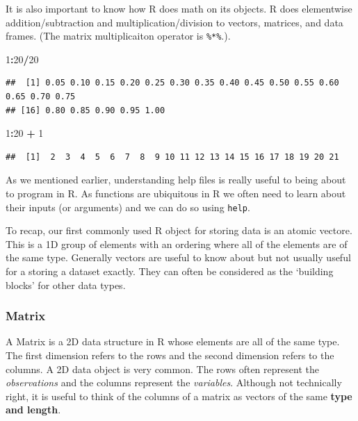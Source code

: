 \documentclass[
]{book}
\newenvironment{Shaded}{\begin{snugshade}}{\end{snugshade}}
\newcommand{\DecValTok}[1]{\textcolor[rgb]{0.00,0.00,0.81}{#1}}
\newcommand{\OperatorTok}[1]{\textcolor[rgb]{0.81,0.36,0.00}{\textbf{#1}}}
\newcommand{\StringTok}[1]{\textcolor[rgb]{0.31,0.60,0.02}{#1}}
\theoremstyle{definition}
\theoremstyle{definition}
\theoremstyle{definition}
\theoremstyle{remark}
\begin{document}
It is also important to know how R does math on its objects. R does elementwise addition/subtraction and multiplication/division to vectors, matrices, and data frames. (The matrix multiplicaiton operator is \texttt{\%*\%}.).

\begin{Shaded}
\begin{Highlighting}[]
\DecValTok{1}\OperatorTok{:}\DecValTok{20}\OperatorTok{/}\DecValTok{20}
\end{Highlighting}
\end{Shaded}

\begin{verbatim}
##  [1] 0.05 0.10 0.15 0.20 0.25 0.30 0.35 0.40 0.45 0.50 0.55 0.60 0.65 0.70 0.75
## [16] 0.80 0.85 0.90 0.95 1.00
\end{verbatim}

\begin{Shaded}
\begin{Highlighting}[]
\DecValTok{1}\OperatorTok{:}\DecValTok{20} \OperatorTok{+}\StringTok{ }\DecValTok{1}
\end{Highlighting}
\end{Shaded}

\begin{verbatim}
##  [1]  2  3  4  5  6  7  8  9 10 11 12 13 14 15 16 17 18 19 20 21
\end{verbatim}

As we mentioned earlier, understanding help files is really useful to being about to program in R. As functions are ubiquitous in R we often need to learn about their inputs (or arguments) and we can do so using \texttt{help}.

To recap, our first commonly used R object for storing data is an atomic vectore. This is a 1D group of elements with an ordering where all of the elements are of the same type. Generally vectors are useful to know about but not usually useful for a storing a dataset exactly. They can often be considered as the `building blocks' for other data types.

\hypertarget{matrix}{%
\subsubsection{Matrix}\label{matrix}}

A Matrix is a 2D data structure in R whose elements are all of the same type. The first dimension refers to the rows and the second dimension refers to the columns. A 2D data object is very common. The rows often represent the \emph{observations} and the columns represent the \emph{variables}. Although not technically right, it is useful to think of the columns of a matrix as vectors of the same \textbf{type and length}.
\end{document}
